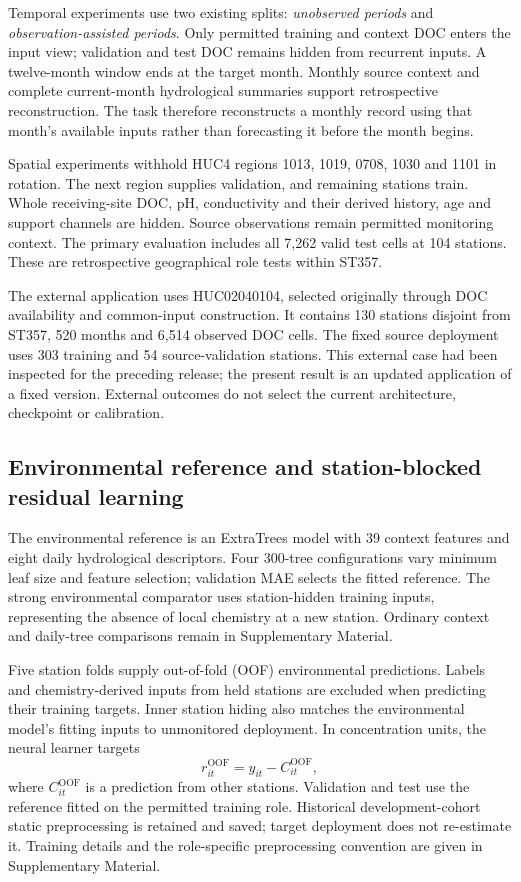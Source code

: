 \documentclass[11pt]{article}
\begin{document}
Temporal experiments use two existing splits: \emph{unobserved periods} and \emph{observation-assisted periods}. Only permitted training and context DOC enters the input view; validation and test DOC remains hidden from recurrent inputs. A twelve-month window ends at the target month. Monthly source context and complete current-month hydrological summaries support retrospective reconstruction. The task therefore reconstructs a monthly record using that month's available inputs rather than forecasting it before the month begins.

Spatial experiments withhold HUC4 regions 1013, 1019, 0708, 1030 and 1101 in rotation. The next region supplies validation, and remaining stations train. Whole receiving-site DOC, pH, conductivity and their derived history, age and support channels are hidden. Source observations remain permitted monitoring context. The primary evaluation includes all 7,262 valid test cells at 104 stations. These are retrospective geographical role tests within ST357.

The external application uses HUC02040104, selected originally through DOC availability and common-input construction. It contains 130 stations disjoint from ST357, 520 months and 6,514 observed DOC cells. The fixed source deployment uses 303 training and 54 source-validation stations. This external case had been inspected for the preceding release; the present result is an updated application of a fixed version. External outcomes do not select the current architecture, checkpoint or calibration.

\subsection{Environmental reference and station-blocked residual learning}
The environmental reference is an ExtraTrees model with 39 context features and eight daily hydrological descriptors. Four 300-tree configurations vary minimum leaf size and feature selection; validation MAE selects the fitted reference. The strong environmental comparator uses station-hidden training inputs, representing the absence of local chemistry at a new station. Ordinary context and daily-tree comparisons remain in Supplementary Material.

Five station folds supply out-of-fold (OOF) environmental predictions. Labels and chemistry-derived inputs from held stations are excluded when predicting their training targets. Inner station hiding also matches the environmental model's fitting inputs to unmonitored deployment. In concentration units, the neural learner targets
\[
 r^{\mathrm{OOF}}_{it}=y_{it}-C^{\mathrm{OOF}}_{it},
\]
where $C^{\mathrm{OOF}}_{it}$ is a prediction from other stations. Validation and test use the reference fitted on the permitted training role. Historical development-cohort static preprocessing is retained and saved; target deployment does not re-estimate it. Training details and the role-specific preprocessing convention are given in Supplementary Material.
\end{document}
